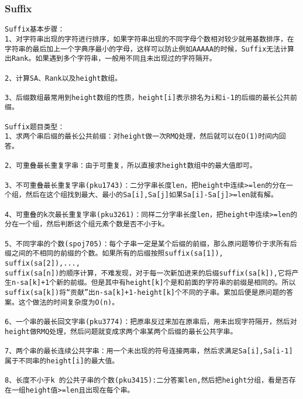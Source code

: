\subsubsection{Suffix}

\begin{verbatim}
Suffix基本步骤：
1、对字符串出现的字符进行排序，如果字符串出现的不同字母个数相对较少就用基数排序，在字符串的最后加上一个字典序最小的字母，这样可以防止例如AAAAA的时候，Suffix无法计算出Rank。如果遇到多个字符串，一般用不同且未出现过的字符隔开。

2、计算SA、Rank以及height数组。

3、后缀数组最常用到height数组的性质，height[i]表示排名为i和i-1的后缀的最长公共前缀。

Suffix题目类型：
1、求两个串后缀的最长公共前缀：对height做一次RMQ处理，然后就可以在O(1)时间内回答。

2、可重叠最长重复字串：由于可重复，所以直接求height数组中的最大值即可。

3、不可重叠最长重复字串(pku1743)：二分字串长度len，把height中连续>=len的分在一个组，然后在这个组找到最大、最小的Sa[i],Sa[j]如果Sa[i]-Sa[j]>=len就有解。

4、可重叠的k次最长重复字串(pku3261)：同样二分字串长度len，把height中连续>=len的分在一个组，然后判断这个组元素个数是否不小于k。

5、不同字串的个数(spoj705)：每个子串一定是某个后缀的前缀，那么原问题等价于求所有后缀之间的不相同的前缀的个数。如果所有的后缀按照suffix(sa[1]), suffix(sa[2]),...,
suffix(sa[n])的顺序计算，不难发现，对于每一次新加进来的后缀suffix(sa[k]),它将产生n-sa[k]+1个新的前缀。但是其中有height[k]个是和前面的字符串的前缀是相同的。所以suffix(sa[k])将“贡献”出n-sa[k]+1-height[k]个不同的子串。累加后便是原问题的答案。这个做法的时间复杂度为O(n)。

6、一个串的最长回文字串(pku3774)：把原串反过来加在原串后，用未出现字符隔开，然后对height做RMQ处理，然后问题就变成求两个串某两个后缀的最长公共字串。

7、两个串的最长连续公共字串：用一个未出现的符号连接两串，然后求满足Sa[i],Sa[i-1]属于不同串的height[i]的最大值。

8、长度不小于k 的公共子串的个数(pku3415):二分答案len,然后把height分组，看是否存在一组height值>=len且出现在每个串。
\end{verbatim}


